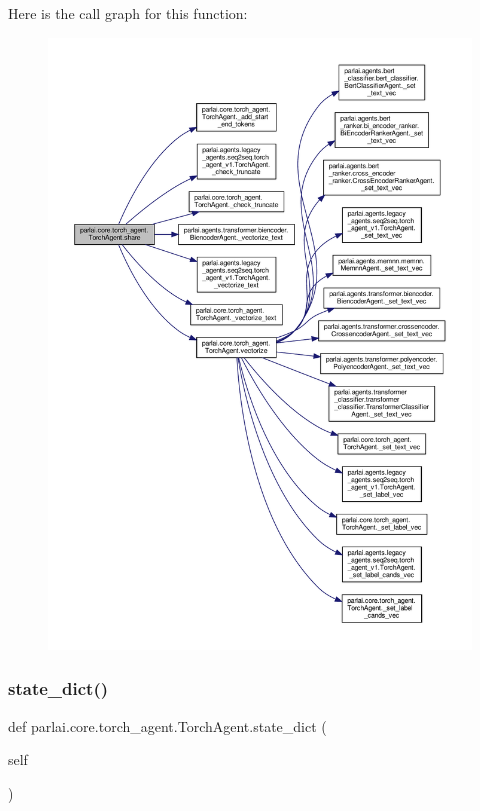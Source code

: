 Here is the call graph for this function\+:
\nopagebreak
\begin{figure}[H]
\begin{center}
\leavevmode
\includegraphics[width=350pt]{classparlai_1_1core_1_1torch__agent_1_1TorchAgent_a373f0e276bf7c9d914a4e3363e9c2712_cgraph}
\end{center}
\end{figure}
\mbox{\label{classparlai_1_1core_1_1torch__agent_1_1TorchAgent_a9f89e606931a4622a5c6a6f6b832235c}} 
\subsubsection{\texorpdfstring{state\+\_\+dict()}{state\_dict()}}
{\footnotesize\ttfamily def parlai.\+core.\+torch\+\_\+agent.\+Torch\+Agent.\+state\+\_\+dict (\begin{DoxyParamCaption}\item[{}]{self }\end{DoxyParamCaption})}


